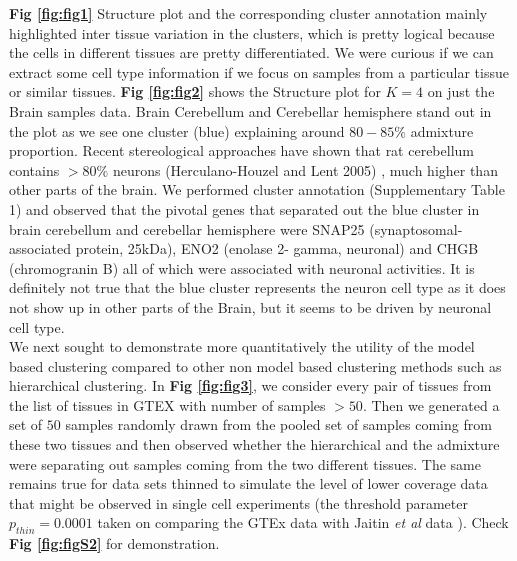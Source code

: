
\textbf{Fig \ref{fig:fig1}} Structure plot and the corresponding cluster annotation mainly highlighted inter tissue variation in the clusters, which is pretty logical because the cells in different tissues are pretty differentiated. We were curious if we can extract some cell type information if we focus on samples from a particular tissue or similar tissues. \textbf{Fig \ref{fig:fig2}} shows the Structure plot for $K=4$ on just the Brain samples data. Brain Cerebellum and Cerebellar hemisphere stand out in the plot as we see one cluster (blue) explaining around $80-85 \%$ admixture proportion. Recent stereological approaches have shown that rat cerebellum contains $> 80 \%$ neurons (Herculano-Houzel and Lent 2005) \cite{Houzel2005}, much higher than other parts of the brain. We performed cluster annotation (Supplementary Table 1) and observed that the pivotal genes that separated out the blue cluster in brain cerebellum and cerebellar hemisphere were SNAP25 (synaptosomal-associated protein, 25kDa), ENO2 (enolase 2- gamma, neuronal) and CHGB (chromogranin B) all of which were associated with neuronal activities. It is definitely not true that the blue cluster represents the neuron cell type as it does not show up in other parts of the Brain, but it seems to be driven by neuronal cell type.\\[3 pt]

We next sought to demonstrate more quantitatively the utility of the model based clustering compared to other non model based clustering methods such as hierarchical clustering. In \textbf{Fig \ref{fig:fig3}}, we consider every pair of tissues from the list of tissues in GTEX with number of samples $> 50$. Then we generated a set of $50$ samples randomly drawn from the pooled set of samples coming from these two tissues and then observed whether the hierarchical and the admixture were separating out samples coming from the two different tissues. The same remains true for data sets thinned to simulate the level of lower coverage data that might be observed in single cell experiments (the threshold parameter $p_{thin}=0.0001$ taken on comparing the GTEx data with Jaitin \textit{et al} data \cite{Jaitin2014}). Check  \textbf{Fig \ref{fig:figS2}} for demonstration.  \\[1 pt]

